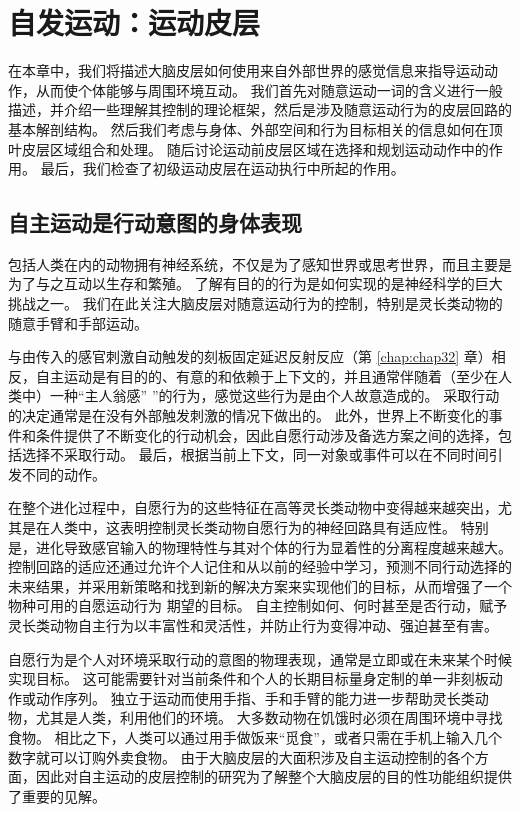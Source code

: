\chapter{自发运动：运动皮层} \label{chap:chap34}

在本章中，我们将描述大脑皮层如何使用来自外部世界的感觉信息来指导运动动作，从而使个体能够与周围环境互动。
我们首先对随意运动一词的含义进行一般描述，并介绍一些理解其控制的理论框架，然后是涉及随意运动行为的皮层回路的基本解剖结构。
然后我们考虑与身体、外部空间和行为目标相关的信息如何在顶叶皮层区域组合和处理。
随后讨论运动前皮层区域在选择和规划运动动作中的作用。
最后，我们检查了初级运动皮层在运动执行中所起的作用。


\section{自主运动是行动意图的身体表现}

包括人类在内的动物拥有神经系统，不仅是为了感知世界或思考世界，而且主要是为了与之互动以生存和繁殖。
了解有目的的行为是如何实现的是神经科学的巨大挑战之一。
我们在此关注大脑皮层对随意运动行为的控制，特别是灵长类动物的随意手臂和手部运动。


与由传入的感官刺激自动触发的刻板固定延迟反射反应（第 \ref{chap:chap32} 章）相反，自主运动是有目的的、有意的和依赖于上下文的，并且通常伴随着（至少在人类中）一种“主人翁感” ”的行为，感觉这些行为是由个人故意造成的。
采取行动的决定通常是在没有外部触发刺激的情况下做出的。
此外，世界上不断变化的事件和条件提供了不断变化的行动机会，因此自愿行动涉及备选方案之间的选择，包括选择不采取行动。
最后，根据当前上下文，同一对象或事件可以在不同时间引发不同的动作。


在整个进化过程中，自愿行为的这些特征在高等灵长类动物中变得越来越突出，尤其是在人类中，这表明控制灵长类动物自愿行为的神经回路具有适应性。
特别是，进化导致感官输入的物理特性与其对个体的行为显着性的分离程度越来越大。
控制回路的适应还通过允许个人记住和从以前的经验中学习，预测不同行动选择的未来结果，并采用新策略和找到新的解决方案来实现他们的目标，从而增强了一个物种可用的自愿运动行为 期望的目标。
自主控制如何、何时甚至是否行动，赋予灵长类动物自主行为以丰富性和灵活性，并防止行为变得冲动、强迫甚至有害。


自愿行为是个人对环境采取行动的意图的物理表现，通常是立即或在未来某个时候实现目标。
这可能需要针对当前条件和个人的长期目标量身定制的单一非刻板动作或动作序列。
独立于运动而使用手指、手和手臂的能力进一步帮助灵长类动物，尤其是人类，利用他们的环境。
大多数动物在饥饿时必须在周围环境中寻找食物。
相比之下，人类可以通过用手做饭来“觅食”，或者只需在手机上输入几个数字就可以订购外卖食物。
由于大脑皮层的大面积涉及自主运动控制的各个方面，因此对自主运动的皮层控制的研究为了解整个大脑皮层的目的性功能组织提供了重要的见解。



